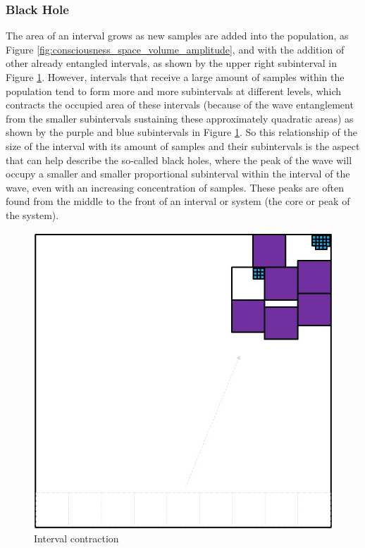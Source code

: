 \subsubsection{Black Hole}
The area of an interval grows as new samples are added into the population, as Figure \ref{fig:consciousness_space_volume_amplitude}, and with the addition of other already entangled intervals, as shown by the upper right subinterval in Figure \ref{fig:consciousness_interval_contraction}. However, intervals that receive a large amount of samples within the population tend to form more and more subintervals at different levels, which contracts the occupied area of these intervals (because of the wave entanglement from the smaller subintervals sustaining these approximately quadratic areas) as shown by the purple and blue subintervals in Figure \ref{fig:consciousness_interval_contraction}. So this relationship of the size of the interval with its amount of samples and their subintervals is the aspect that can help describe the so-called black holes, where the peak of the wave will occupy a smaller and smaller proportional subinterval within the interval of the wave, even with an increasing concentration of samples. These peaks are often found from the middle to the front of an interval or system (the core or peak of the system).
	\begin{figure}[H]
	\caption{Interval contraction}
	\label{fig:consciousness_interval_contraction}
	\centering
	\includegraphics[scale=.5]{sections/images/consciousness_interval_contraction.jpg}
	\end{figure}
	

